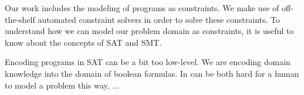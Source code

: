 Our work includes the modeling of programs as constraints. We make use of
off-the-shelf automated constraint solvers in order to solve these constraints.
To understand how we can model our problem domain as constraints, it is useful
to know about the concepts of \gls{SAT} and \gls{SMT}.




Encoding programs in SAT can be a bit too low-level. We are encoding domain
knowledge into the domain of boolean formulas. In can be both hard for a human
to model a problem this way, ...



